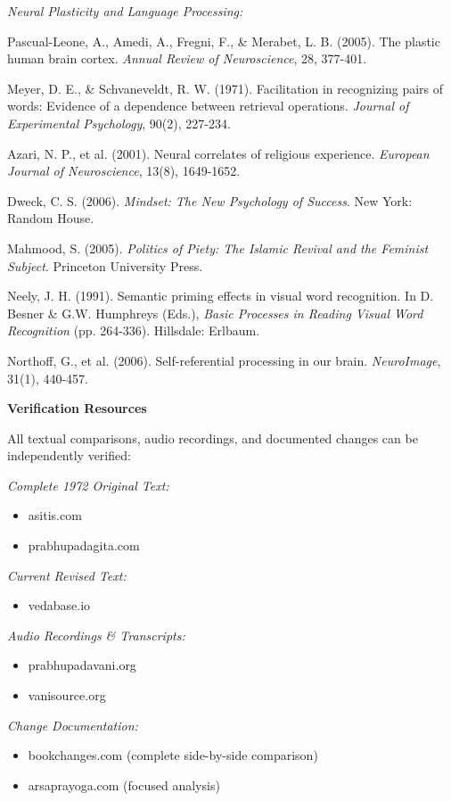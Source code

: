 \documentclass[12pt,twoside]{book}
\begin{document}
\emph{Neural Plasticity and Language Processing:}

Pascual-Leone, A., Amedi, A., Fregni, F., \& Merabet, L. B. (2005). The plastic human brain cortex. \emph{Annual Review of Neuroscience}, 28, 377-401.

Meyer, D. E., \& Schvaneveldt, R. W. (1971). Facilitation in recognizing pairs of words: Evidence of a dependence between retrieval operations. \emph{Journal of Experimental Psychology}, 90(2), 227-234.

Azari, N. P., et al. (2001). Neural correlates of religious experience. \emph{European Journal of Neuroscience}, 13(8), 1649-1652.

Dweck, C. S. (2006). \emph{Mindset: The New Psychology of Success}. New York: Random House.

Mahmood, S. (2005). \emph{Politics of Piety: The Islamic Revival and the Feminist Subject}. Princeton University Press.

Neely, J. H. (1991). Semantic priming effects in visual word recognition. In D. Besner \& G.W. Humphreys (Eds.), \emph{Basic Processes in Reading Visual Word Recognition} (pp. 264-336). Hillsdale: Erlbaum.

Northoff, G., et al. (2006). Self-referential processing in our brain. \emph{NeuroImage}, 31(1), 440-457.

\vspace{0.5cm}

\textbf{\textbf{Verification Resources}}

All textual comparisons, audio recordings, and documented changes can be independently verified:

\emph{Complete 1972 Original Text:}
\begin{itemize}
\item asitis.com
\item prabhupadagita.com
\end{itemize}

\emph{Current Revised Text:}
\begin{itemize}
\item vedabase.io
\end{itemize}

\emph{Audio Recordings \& Transcripts:}
\begin{itemize}
\item prabhupadavani.org
\item vanisource.org
\end{itemize}

\emph{Change Documentation:}
\begin{itemize}
\item bookchanges.com (complete side-by-side comparison)
\item arsaprayoga.com (focused analysis)
\end{itemize}
\end{document}
